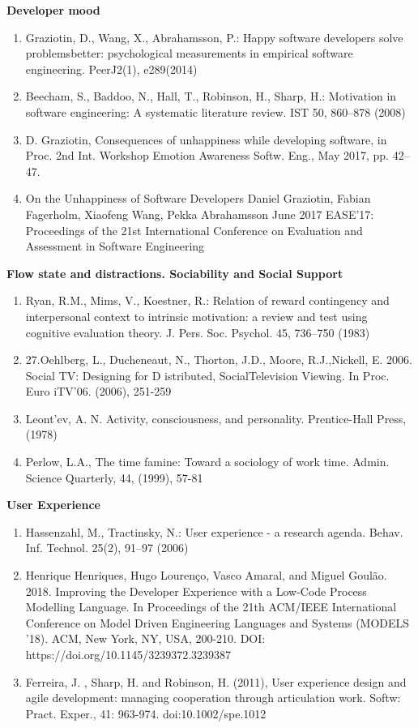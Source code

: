 \documentclass[english, 12pt, a4paper, sci, utf8, a-1b, online]{aaltothesis}
\begin{document}
\textbf{Developer mood}
\begin{enumerate}
  \item Graziotin, D., Wang, X., Abrahamsson, P.: Happy software developers solve problemsbetter: psychological measurements in empirical software engineering. PeerJ2(1), e289(2014)
  \item Beecham, S., Baddoo, N., Hall, T., Robinson, H., Sharp, H.: Motivation in software engineering: A systematic literature review. IST 50, 860–878 (2008)
  \item D. Graziotin, Consequences of unhappiness while developing software, in Proc. 2nd Int. Workshop Emotion Awareness Softw. Eng., May 2017, pp. 42–47.
  \item On the Unhappiness of Software Developers Daniel Graziotin, Fabian Fagerholm, Xiaofeng Wang, Pekka Abrahamsson June 2017 EASE'17: Proceedings of the 21st International Conference on Evaluation and Assessment in Software Engineering
\end{enumerate}

\textbf{Flow state and distractions. Sociability and Social Support}
\begin{enumerate}
  \item Ryan, R.M., Mims, V., Koestner, R.: Relation of reward contingency and interpersonal context to intrinsic motivation: a review and test using cognitive evaluation theory. J. Pers. Soc. Psychol. 45, 736–750 (1983)
  \item 27.Oehlberg,  L.,  Ducheneaut,  N.,  Thorton,  J.D.,  Moore,  R.J.,Nickell,  E.  2006.  Social  TV:  Designing  for  D istributed,  SocialTelevision Viewing. In Proc. Euro iTV’06. (2006), 251-259
  \item Leont’ev,  A.  N.  Activity,  consciousness,  and  personality.  Prentice-Hall Press, (1978)
  \item Perlow, L.A., The time famine: Toward a sociology of work time. Admin. Science Quarterly, 44, (1999), 57-81
\end{enumerate}

\textbf{User Experience}
\begin{enumerate}
  \item Hassenzahl, M., Tractinsky, N.: User experience - a research agenda. Behav. Inf. Technol. 25(2), 91–97 (2006)
  \item Henrique Henriques, Hugo Lourenço, Vasco Amaral, and Miguel Goulão. 2018. Improving the Developer Experience with a Low-Code Process Modelling Language. In Proceedings of the 21th ACM/IEEE International Conference on Model Driven Engineering Languages and Systems (MODELS '18). ACM, New York, NY, USA, 200-210. DOI: https://doi.org/10.1145/3239372.3239387
  \item Ferreira, J. , Sharp, H. and Robinson, H. (2011), User experience design and agile development: managing cooperation through articulation work. Softw: Pract. Exper., 41: 963-974. doi:10.1002/spe.1012
\end{enumerate}
\end{document}
